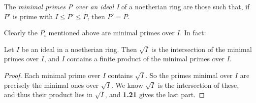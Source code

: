 \documentclass[10pt,a4paper]{article}
\begin{document}
\begin{definition}
  The \emph{minimal primes P over an ideal I} of a noetherian ring are those such that, if $P'$ is prime with $I \leq P' \leq P$, then $P' = P$.
\end{definition}
Clearly the $P_i$ mentioned above are minimal primes over $I$. In fact:

\begin{lemma}
  Let $I$ be an ideal in a noetherian ring. Then $\sqrt{I}$ is the intersection of the minimal primes over $I$, and $I$ contains a finite product of the minimal primes over $I$.
\end{lemma}
\begin{proof}
  Each minimal prime over $I$ contains $\sqrt{I}$. So the primes minimal over $I$ are precisely the minimal ones over $\sqrt{I}$. We know $\sqrt{I}$ is the intersection of these, and thus their product lies in $\sqrt{I}$, and \textbf{1.21} gives the last part.
\end{proof}
\end{document}
